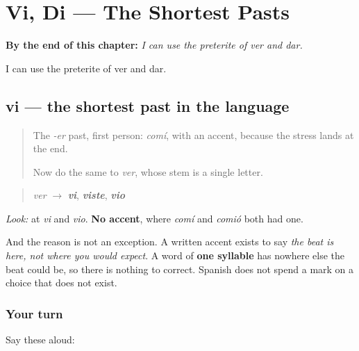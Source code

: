 
\chapter{Vi, Di --- The Shortest Pasts}
\label{ch:vi-di}

\begin{chapteropening}
\textbf{By the end of this chapter:} \emph{I can use the preterite of ver and dar.}

I can use the preterite of ver and dar.
\end{chapteropening}

\section[vi]{vi — the shortest past in the language}

\label{lesson:ES-C65-vi-di}



\begin{quote}
The \emph{-er} past, first person: \emph{comí}, with an accent, because the stress lands at the end.

Now do the same to \emph{ver}, whose stem is a single letter.
\end{quote}

\begin{grammarlens}[title={Grammar Lens: nothing left to accent}]
\begin{quote}
\emph{ver} $\to$ \emph{\textbf{vi}}, \emph{\textbf{viste}}, \emph{\textbf{vio}}
\end{quote}

\emph{Look:} at \emph{vi} and \emph{vio}. \textbf{No accent}, where \emph{comí} and \emph{comió} both had one.

And the reason is not an exception. A written accent exists to say \emph{the beat is here, not where you would expect}. A word of \textbf{one syllable} has nowhere else the beat could be, so there is nothing to correct. Spanish does not spend a mark on a choice that does not exist.
\end{grammarlens}

\subsection*{Your turn}
Say these aloud:


